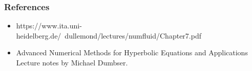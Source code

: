 \documentclass[12pt]{beamer}
\begin{document}
\begin{frame}
	\frametitle{References}
	\begin{itemize}
		\item https://www.ita.uni-heidelberg.de/~dullemond/lectures/num\textunderscore fluid/Chapter\textunderscore7.pdf
		\item Advanced Numerical Methods for Hyperbolic Equations and Applications Lecture notes by Michael Dumbser.
	\end{itemize}
	    
	    
	
	
	
\end{frame}
\end{document}
